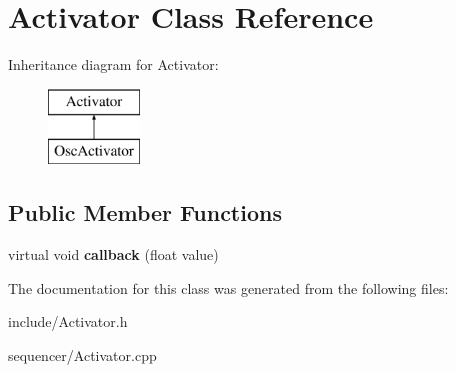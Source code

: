 \hypertarget{classActivator}{}\section{Activator Class Reference}
\label{classActivator}
Inheritance diagram for Activator\+:\begin{figure}[H]
\begin{center}
\leavevmode
\includegraphics[height=2.000000cm]{classActivator}
\end{center}
\end{figure}
\subsection*{Public Member Functions}
\begin{DoxyCompactItemize}
\item 
virtual void {\bfseries callback} (float value)\hypertarget{classActivator_ace74b175ffcc2ad9cc03f15a0e713743}{}\label{classActivator_ace74b175ffcc2ad9cc03f15a0e713743}

\end{DoxyCompactItemize}


The documentation for this class was generated from the following files\+:\begin{DoxyCompactItemize}
\item 
include/Activator.\+h\item 
sequencer/Activator.\+cpp\end{DoxyCompactItemize}
